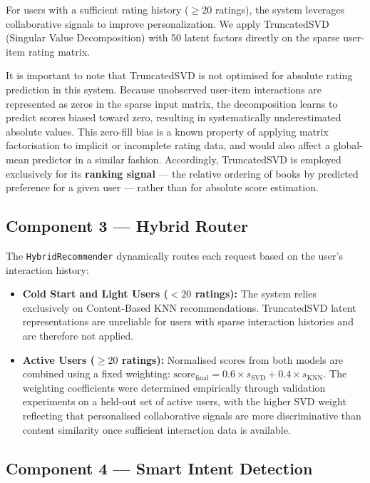 \documentclass[12pt, a4paper]{article}
\begin{document}
For users with a sufficient rating history ($\ge 20$ ratings), the system leverages collaborative signals to improve personalization. We apply TruncatedSVD (Singular Value Decomposition) with 50 latent factors directly on the sparse user-item rating matrix. 

It is important to note that TruncatedSVD is not optimised for absolute rating
prediction in this system.
Because unobserved user-item interactions are represented as zeros in the sparse
input matrix, the decomposition learns to predict scores biased toward zero,
resulting in systematically underestimated absolute values.
This zero-fill bias is a known property of applying matrix factorisation to
implicit or incomplete rating data, and would also affect a global-mean predictor
in a similar fashion.
Accordingly, TruncatedSVD is employed exclusively for its \textbf{ranking signal}
--- the relative ordering of books by predicted preference for a given user ---
rather than for absolute score estimation.

\subsection{Component 3 --- Hybrid Router}
\label{sec:router}

The \texttt{HybridRecommender} dynamically routes each request based on the user's
interaction history:

\begin{itemize}[leftmargin=2cm]
  \item \textbf{Cold Start and Light Users ($< 20$ ratings):}
        The system relies exclusively on Content-Based KNN recommendations.
        TruncatedSVD latent representations are unreliable for users with sparse
        interaction histories and are therefore not applied.
  \item \textbf{Active Users ($\ge 20$ ratings):}
        Normalised scores from both models are combined using a fixed weighting:
        $\text{score}_{\text{final}} = 0.6 \times s_{\text{SVD}} + 0.4 \times s_{\text{KNN}}$.
        The weighting coefficients were determined empirically through validation
        experiments on a held-out set of active users, with the higher SVD weight
        reflecting that personalised collaborative signals are more discriminative
        than content similarity once sufficient interaction data is available.
\end{itemize}

\subsection{Component 4 --- Smart Intent Detection}
\label{sec:intent}
\end{document}
